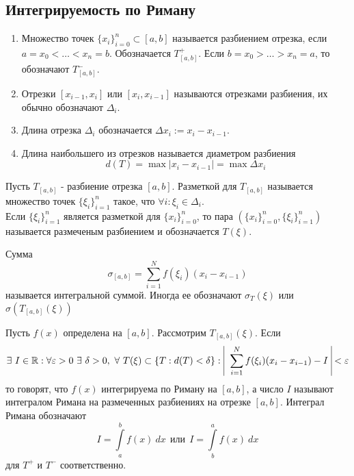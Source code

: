 \subsection{Интегрируемость по Риману}
\begin{definition}\tab
    \begin{enumerate}
        \item Множество точек $\{x_i\}_{i=0}^n\subset [a,b]$ называется разбиением отрезка, если $a=x_0<\dots<x_n=b$. Обозначается $T_{[a,b]}^+$. Если $b=x_0>\dots>x_n=a$, то обозначают $T_{[a,b]}^-$.
        \item Отрезки $[x_{i-1},x_i]$ или $[x_i, x_{i-1}]$ называются отрезками разбиения, их обычно обозначают $\Delta_i$.
        \item Длина отрезка $\Delta_i$ обозначается $\Delta x_i := x_i-x_{i-1}$.
        \item Длина наибольшего из отрезков называется диаметром разбиения \[d(T)=\max|x_i-x_{i-1}| = \max{\Delta x_i}\]
    \end{enumerate} 
\end{definition} 
\begin{definition}
    Пусть $T_{[a,b]}$ - разбиение отрезка $[a,b]$. Разметкой для $T_{[a,b]}$ называется множество точек $\{\xi_i\}_{i=1}^n$ такое, что $\forall i: \xi_i \in \Delta_i$.\\
    Если $\{\xi_i\}_{i=1}^n$ является разметкой для $\{x_i\}_{i=0}^n$, то пара $\left(\{x_i\}_{i=0}^n, \{\xi_i\}_{i=1}^n\right)$ называется размеченым разбиением и обозначается $T(\xi)$.
\end{definition} 
\begin{definition}
    Сумма 
    \[\sigma_{[a,b]}=\sum\limits_{i=1}^{N}f(\xi_i)(x_i-x_{i-1})\]
    называется интегральной суммой. Иногда ее обозначают $\sigma_T(\xi)$ или $\sigma(T_{[a,b]}(\xi))$
\end{definition} 
\begin{definition}
    Пусть $f(x)$ определена на $[a,b]$. Рассмотрим $T_{[a,b]}(\xi)$. Если
    \[\exists\ I\in \R: \forall \epsilon>0\ \exists\ \delta>0,\ \forall\ T(\xi)\subset \{T:d(T)<\delta\}:\ \vline\ \sum\limits_{i=1}^{N}f(\xi_i)(x_i-x_{i-1})-I\ \vline <\epsilon\]
    то говорят, что $f(x)$ интегрируема по Риману на $[a,b]$, а число $I$ называют интегралом Римана на размеченных разбиениях на отрезке $[a,b]$. Интеграл Римана обозначают
    \[I=\int\limits_{a}^{b}f(x)\ dx\ \ \text{или}\ \ I=\int\limits_{b}^{a}f(x)\ dx\]
    для $T^+$ и $T^-$ соответственно. 
\end{definition} 
